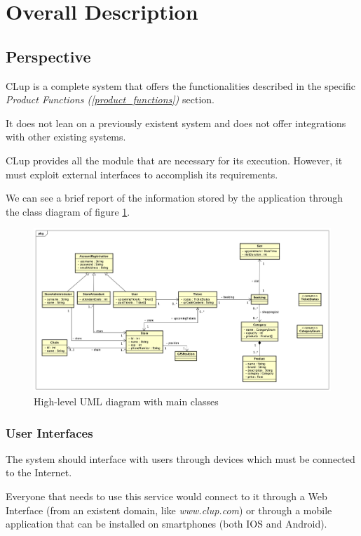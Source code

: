 \documentclass[table, 12pt]{article}
\begin{document}
\section{Overall Description}
\subsection{Perspective}
CLup is a complete system that offers the functionalities described in the specific \textit{Product Functions (\ref{product_functions})} section.

It does not lean on a previously existent system and does not offer integrations with other existing systems.

CLup provides all the module that are necessary for its execution. However, it must exploit external interfaces to accomplish its requirements.

We can see a brief report of the information stored by the application through the class diagram of figure \ref{class_diagram}.

\begin{figure}[H]
    \hspace{-108px}
    \includegraphics[scale=0.46]{assets/UML/HighLevelUML.png}
    \caption{High-level UML diagram with main classes}
    \label{class_diagram}

\end{figure}

\subsubsection{User Interfaces}
The system should interface with users through devices which must be connected to the Internet.

Everyone that needs to use this service would connect to it through a Web Interface (from an existent domain, like \textit{www.clup.com}) or through a mobile application that can be installed on smartphones (both IOS and Android).
\end{document}
